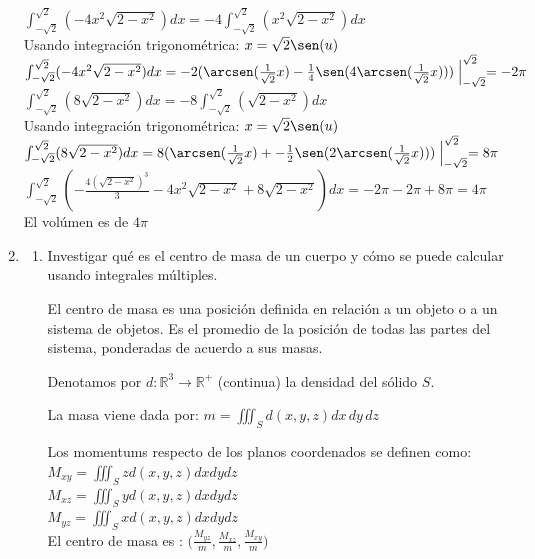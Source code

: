 \documentclass{article}
\begin{document}
\begin{enumerate}
{        $\int_{-\sqrt{2}}^{\sqrt{2}}(-4x^2\sqrt{2-x^2})dx = -4\int_{-\sqrt{2}}^{\sqrt{2}}(x^2\sqrt{2-x^2})dx$\\
        Usando integración trigonométrica: $x = \sqrt{2}\sen(u)$\\
        $\int_{-\sqrt{2}}^{\sqrt{2}}(-4x^2\sqrt{2-x^2})dx = -2(\arcsen(\frac{1}{\sqrt{2}}x) - \frac{1}{4}\sen(4\arcsen(\frac{1}{\sqrt{2}}x)))\Bigm|_{-\sqrt{2}}^{\sqrt{2}} = -2\pi$\\

        $\int_{-\sqrt{2}}^{\sqrt{2}}(8\sqrt{2-x^2})dx = -8\int_{-\sqrt{2}}^{\sqrt{2}}(\sqrt{2-x^2})dx$\\
        Usando integración trigonométrica: $x = \sqrt{2}\sen(u)$\\
        $\int_{-\sqrt{2}}^{\sqrt{2}}(8\sqrt{2-x^2})dx = 8(\arcsen(\frac{1}{\sqrt{2}}x)+- \frac{1}{2}\sen(2\arcsen(\frac{1}{\sqrt{2}}x)))\Bigm|_{-\sqrt{2}}^{\sqrt{2}} = 8\pi$\\
        $\int_{-\sqrt{2}}^{\sqrt{2}}(-\frac{4(\sqrt{2-x^2})^3}{3} -4x^2\sqrt{2-x^2} + 8\sqrt{2-x^2})dx = -2\pi -2\pi + 8\pi = 4\pi$\\
        El volúmen es de $4\pi$
    }

    \item {
        \begin{enumerate}
        \item{
            Investigar qué es el centro de masa de un cuerpo y cómo se puede calcular usando integrales múltiples.

            \color{azul}
            El centro de masa es una posición definida en relación a un objeto o a un sistema de objetos. Es el promedio de la posición de todas las partes del sistema, ponderadas de acuerdo a sus masas.

            Denotamos por $d : \mathbb{R}^3 \rightarrow \mathbb{R}^+$ (continua) la densidad del sólido $S$.

            La masa viene dada por:	$m = \iiint_S d(x,y,z)dx\,dy\,dz$

            Los momentums respecto de los planos coordenados se definen como:\\
            $M_{xy} = \iiint_S zd(x,y,z)dxdydz$\\
            $M_{xz} = \iiint_S yd(x,y,z)dxdydz$\\
            $M_{yz} = \iiint_S xd(x,y,z)dxdydz$\\

            El centro de masa es : $\Big(\frac{M_{yz}}{m},\frac{M_{xz}}{m},\frac{M_{xy}}{m} \Big)$

}
\end{enumerate}}
\end{enumerate}
\end{document}
